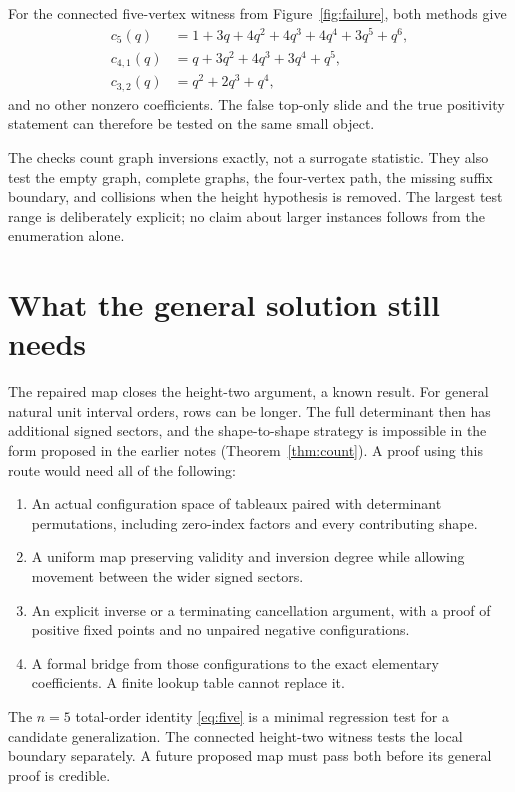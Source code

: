 \documentclass[11pt,a4paper]{article}
\theoremstyle{definition}
\begin{document}
For the connected five-vertex witness from Figure~\ref{fig:failure}, both
methods give
\begin{align*}
 c_5(q)&=1+3q+4q^2+4q^3+4q^4+3q^5+q^6,\\
 c_{4,1}(q)&=q+3q^2+4q^3+3q^4+q^5,\\
 c_{3,2}(q)&=q^2+2q^3+q^4,
\end{align*}
and no other nonzero coefficients. The false top-only slide and the true
positivity statement can therefore be tested on the same small object.

The checks count graph inversions exactly, not a surrogate statistic. They
also test the empty graph, complete graphs, the four-vertex path, the missing
suffix boundary, and collisions when the height hypothesis is removed.
The largest test range is deliberately explicit; no claim about larger
instances follows from the enumeration alone.

\section{What the general solution still needs}

The repaired map closes the height-two argument, a known result. For general
natural unit interval orders, rows can be longer. The full determinant then
has additional signed sectors, and the shape-to-shape strategy is impossible
in the form proposed in the earlier notes (Theorem~\ref{thm:count}).
A proof using this route would need all of the following:
\begin{enumerate}
\item An actual configuration space of tableaux paired with determinant
permutations, including zero-index factors and every contributing shape.
\item A uniform map preserving validity and inversion degree while allowing
movement between the wider signed sectors.
\item An explicit inverse or a terminating cancellation argument, with a
proof of positive fixed points and no unpaired negative configurations.
\item A formal bridge from those configurations to the exact elementary
coefficients. A finite lookup table cannot replace it.
\end{enumerate}
The $n=5$ total-order identity \eqref{eq:five} is a minimal regression test
for a candidate generalization. The connected height-two witness tests the
local boundary separately. A future proposed map must pass both before its
general proof is credible.
\end{document}
